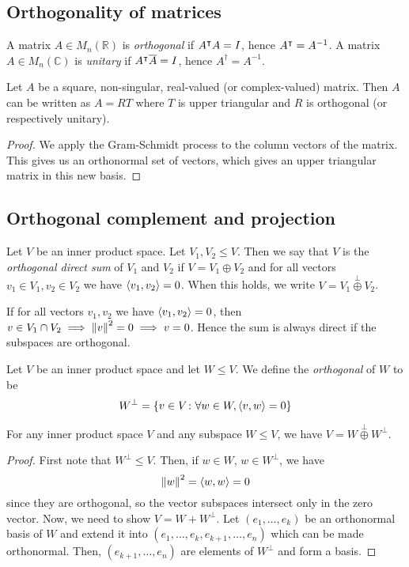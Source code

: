 \subsection{Orthogonality of matrices}
\begin{definition}
	A matrix \( A \in M_n(\mathbb R) \) is \textit{orthogonal} if \( A^\intercal A = I \), hence \( A^\intercal = A^{-1} \).
	A matrix \( A \in M_n(\mathbb C) \) is \textit{unitary} if \( A^\intercal \overline A = I \), hence \( A^\dagger = A^{-1} \).
\end{definition}
\begin{proposition}
	Let \( A \) be a square, non-singular, real-valued (or complex-valued) matrix.
	Then \( A \) can be written as \( A = RT \) where \( T \) is upper triangular and \( R \) is orthogonal (or respectively unitary).
\end{proposition}
\begin{proof}
	We apply the Gram-Schmidt process to the column vectors of the matrix.
	This gives us an orthonormal set of vectors, which gives an upper triangular matrix in this new basis.
\end{proof}

\subsection{Orthogonal complement and projection}
\begin{definition}
	Let \( V \) be an inner product space.
	Let \( V_1, V_2 \leq V \).
	Then we say that \( V \) is the \textit{orthogonal direct sum} of \( V_1 \) and \( V_2 \) if \( V = V_1 \oplus V_2 \) and for all vectors \( v_1\in V_1, v_2\in V_2 \) we have \( \left\langle{v_1, v_2}\right\rangle = 0 \).
	When this holds, we write \( V = V_1 \overset{\perp}{\oplus} V_2 \).
\end{definition}
\begin{remark}
	If for all vectors \( v_1, v_2 \) we have \( \left\langle{v_1, v_2}\right\rangle = 0 \), then \( v \in V_1 \cap V_2 \implies \norm{v}^2 = 0 \implies v = 0 \).
	Hence the sum is always direct if the subspaces are orthogonal.
\end{remark}
\begin{definition}
	Let \( V \) be an inner product space and let \( W \leq V \).
	We define the \textit{orthogonal} of \( W \) to be
	\[
		W^\perp = \qty{v \in V \colon \forall w \in W, \left\langle{v,w}\right\rangle = 0}
	\]
\end{definition}
\begin{lemma}
	For any inner product space \( V \) and any subspace \( W \leq V \), we have \( V = W \overset{\perp}{\oplus} W^\perp \).
\end{lemma}
\begin{proof}
	First note that \( W^\perp \leq V \).
	Then, if \( w \in W \), \( w \in W^\perp \), we have
	\[
		\norm{w}^2 = \left\langle{w, w}\right\rangle = 0
	\]
	since they are orthogonal, so the vector subspaces intersect only in the zero vector.
	Now, we need to show \( V = W + W^\perp \).
	Let \( (e_1, \dots, e_k) \) be an orthonormal basis of \( W \) and extend it into \( (e_1, \dots, e_k, e_{k+1}, \dots, e_n) \) which can be made orthonormal.
	Then, \( (e_{k+1}, \dots, e_n) \) are elements of \( W^\perp \) and form a basis.
\end{proof}

